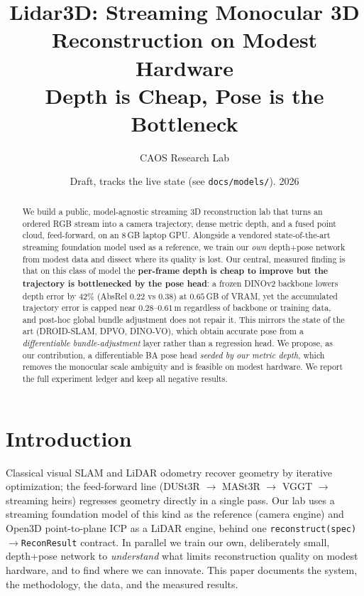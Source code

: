 \documentclass[10pt,twocolumn]{article}
\title{\textbf{Lidar3D: Streaming Monocular 3D Reconstruction on Modest Hardware\\
\large Depth is Cheap, Pose is the Bottleneck}}
\author{CAOS Research Lab}
\date{Draft, tracks the live state (see \texttt{docs/models/}). 2026}
\begin{document}
\maketitle

\begin{abstract}
We build a public, model-agnostic streaming 3D reconstruction lab that turns an ordered RGB stream into a camera
trajectory, dense metric depth, and a fused point cloud, feed-forward, on an 8\,GB laptop GPU. Alongside a vendored
state-of-the-art streaming foundation model used as a reference, we train our \emph{own} depth+pose network from
modest data and dissect where its quality is lost. Our central, measured finding is that on this class of model the
\textbf{per-frame depth is cheap to improve but the trajectory is bottlenecked by the pose head}: a frozen DINOv2
backbone lowers depth error by 42\% (AbsRel $0.22$ vs $0.38$) at $0.65$\,GB of VRAM, yet the accumulated trajectory
error is capped near $0.28$--$0.61$\,m regardless of backbone or training data, and post-hoc global bundle
adjustment does not repair it. This mirrors the state of the art (DROID-SLAM, DPVO, DINO-VO), which obtain accurate
pose from a \emph{differentiable bundle-adjustment} layer rather than a regression head. We propose, as our
contribution, a differentiable BA pose head \emph{seeded by our metric depth}, which removes the monocular
scale ambiguity and is feasible on modest hardware. We report the full experiment ledger and keep all negative
results.
\end{abstract}

\section{Introduction}
Classical visual SLAM and LiDAR odometry recover geometry by iterative optimization; the feed-forward line
(DUSt3R $\to$ MASt3R $\to$ VGGT $\to$ streaming heirs) regresses geometry directly in a single pass. Our lab uses a
streaming foundation model of this kind as the reference (camera engine) and Open3D point-to-plane ICP as a LiDAR
engine, behind one \texttt{reconstruct(spec)$\to$ReconResult} contract. In parallel we train our own, deliberately
small, depth+pose network to \emph{understand} what limits reconstruction quality on modest hardware, and to find
where we can innovate. This paper documents the system, the methodology, the data, and the measured results.
\end{document}
